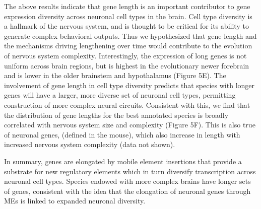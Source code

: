 The above results indicate that gene length is an important contributor to gene expression diversity across neuronal cell types in the brain. Cell type diversity is a hallmark of the nervous system, and is thought to be critical for its ability to generate complex behavioral outputs. Thus we hypothesized that gene length and the mechanisms driving lengthening over time would contribute to the evolution of nervous system complexity. Interestingly, the expression of long genes is not uniform across brain regions, but is highest in the evolutionary newer forebrain and is lower in the older brainstem and hypothalamus (Figure 5E). 
The involvement of gene length in cell type diversity predicts that species with longer genes will have a larger, more diverse set of neuronal cell types, permitting construction of more complex neural circuits. Consistent with this, we find that the distribution of gene lengths for the best annotated species is broadly correlated with nervous system size and complexity (Figure 5F). This is also true of neuronal genes, (defined in the mouse), which also increase in length with increased nervous system complexity (data not shown). 

In summary, genes are elongated by mobile element insertions that provide a substrate for new 
regulatory elements which in turn diversify transcription across neuronal cell types. Species endowed with more complex brains have longer sets of genes, consistent with the idea that the elongation of neuronal genes through MEs is linked to expanded neuronal diversity.




